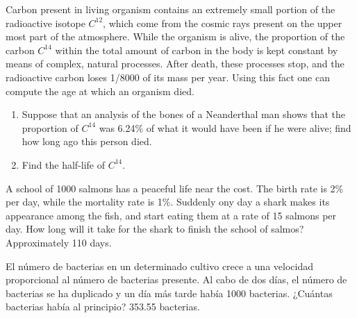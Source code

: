 {Carbon present in living organism contains an extremely small portion of the radioactive isotope $C^{12}$, which come from the cosmic rays present on the upper most part of the atmosphere.
While the organism is alive, the proportion of the carbon $C^{14}$ within the total amount of carbon in the body is kept constant by means of complex, natural processes.
After death, these processes stop, and the radioactive carbon loses 1/8000 of its mass per year.
Using this fact one can compute the age at which an organism died.
\begin{enumerate}
\item Suppose that an analysis of the bones of a Neanderthal man shows that the proportion of $C^{14}$ was 6.24\% of what it would have been if he were alive; find how long ago this person died.
\item Find the half-life of $C^{14}$.
\end{enumerate}
}
{
}
{}


{A school of 1000 salmons has a peaceful life near the cost.
The birth rate is 2\% per day, while the mortality rate is 1\%.
Suddenly ony day a shark makes its appearance among the fish, and start eating them at a rate
of 15 salmons per day.
How long will it take for the shark to finish the school of salmos?
}
{Approximately 110 days.
}
{}


{El número de bacterias en un determinado cultivo crece a una velocidad proporcional al número de bacterias presente.
Al cabo de dos días, el número de bacterias se ha duplicado y un día más tarde había 1000 bacterias.
¿Cuántas bacterias había al principio?
}
{353.55 bacterias.
}
{}
